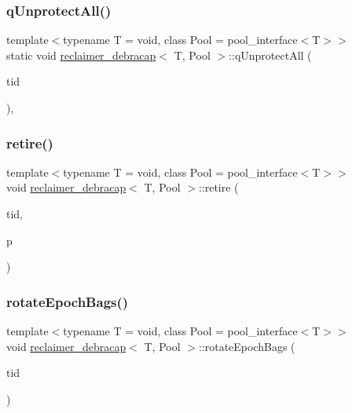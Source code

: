 \subsubsection{\texorpdfstring{q\+Unprotect\+All()}{qUnprotectAll()}}
{\footnotesize\ttfamily template$<$typename T  = void, class Pool  = pool\+\_\+interface$<$\+T$>$$>$ \\
static void \hyperlink{classreclaimer__debracap}{reclaimer\+\_\+debracap}$<$ T, Pool $>$\+::q\+Unprotect\+All (\begin{DoxyParamCaption}\item[{const int}]{tid }\end{DoxyParamCaption})\hspace{0.3cm}{\ttfamily [inline]}, {\ttfamily [static]}}

\mbox{\label{classreclaimer__debracap_acfe29401909be4a5a34bf4ba4978d90b}} 
\subsubsection{\texorpdfstring{retire()}{retire()}}
{\footnotesize\ttfamily template$<$typename T  = void, class Pool  = pool\+\_\+interface$<$\+T$>$$>$ \\
void \hyperlink{classreclaimer__debracap}{reclaimer\+\_\+debracap}$<$ T, Pool $>$\+::retire (\begin{DoxyParamCaption}\item[{const int}]{tid,  }\item[{T $\ast$}]{p }\end{DoxyParamCaption})\hspace{0.3cm}{\ttfamily [inline]}}

\mbox{\label{classreclaimer__debracap_a5304ffe3a8227e5b77275ded7a742d5d}} 
\subsubsection{\texorpdfstring{rotate\+Epoch\+Bags()}{rotateEpochBags()}}
{\footnotesize\ttfamily template$<$typename T  = void, class Pool  = pool\+\_\+interface$<$\+T$>$$>$ \\
void \hyperlink{classreclaimer__debracap}{reclaimer\+\_\+debracap}$<$ T, Pool $>$\+::rotate\+Epoch\+Bags (\begin{DoxyParamCaption}\item[{const int}]{tid }\end{DoxyParamCaption})\hspace{0.3cm}{\ttfamily [inline]}}

